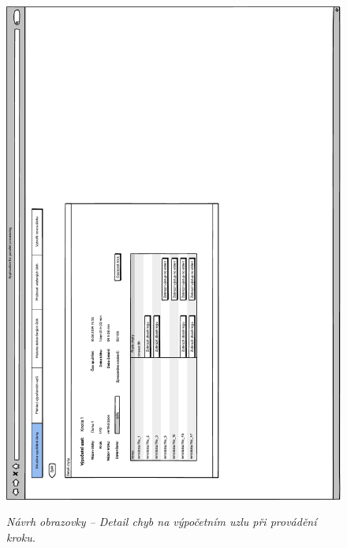 \begin{figure}[H]
\begin{center}
    \scalebox{0.78}
    {   
        \includegraphics{images/wireframe_appendix_errorDetail.pdf}
    }
    \caption{\label{obr:wireframe_appendix_errorDetail} {\it Návrh obrazovky -- Detail chyb na výpočetním uzlu při provádění kroku.}}
\end{center}
\end{figure}


